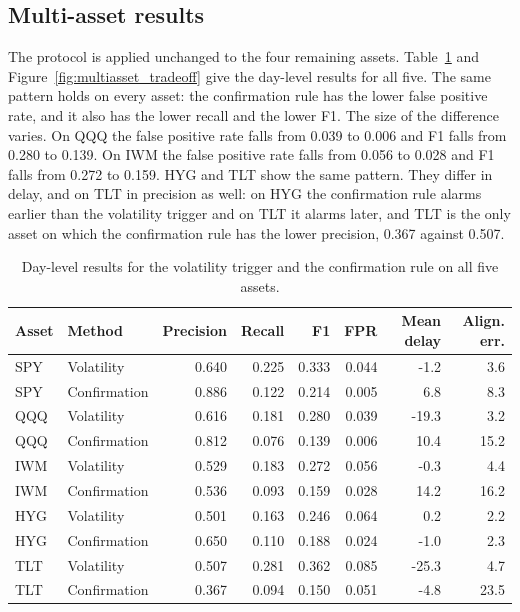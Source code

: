 \documentclass[pdflatex,sn-mathphys-num,iicol]{sn-jnl}
\begin{document}
\subsection{Multi-asset results}
The protocol is applied unchanged to the four remaining assets. Table~\ref{tab:multiasset_pointwise} and Figure~\ref{fig:multiasset_tradeoff} give the day-level results for all five. The same pattern holds on every asset: the confirmation rule has the lower false positive rate, and it also has the lower recall and the lower F1. The size of the difference varies. On QQQ the false positive rate falls from 0.039 to 0.006 and F1 falls from 0.280 to 0.139. On IWM the false positive rate falls from 0.056 to 0.028 and F1 falls from 0.272 to 0.159. HYG and TLT show the same pattern. They differ in delay, and on TLT in precision as well: on HYG the confirmation rule alarms earlier than the volatility trigger and on TLT it alarms later, and TLT is the only asset on which the confirmation rule has the lower precision, 0.367 against 0.507.

\begin{table}[t]
\centering
\caption{Day-level results for the volatility trigger and the confirmation rule on all five assets.}
\label{tab:multiasset_pointwise}
\scriptsize
\begin{tabular}{llrrrrrr}
\toprule
Asset & Method & Precision & Recall & F1 & FPR & Mean delay & Align. err.\\
\midrule
SPY & Volatility & 0.640 & 0.225 & 0.333 & 0.044 & -1.2 & 3.6\\
SPY & Confirmation & 0.886 & 0.122 & 0.214 & 0.005 & 6.8 & 8.3\\
QQQ & Volatility & 0.616 & 0.181 & 0.280 & 0.039 & -19.3 & 3.2\\
QQQ & Confirmation & 0.812 & 0.076 & 0.139 & 0.006 & 10.4 & 15.2\\
IWM & Volatility & 0.529 & 0.183 & 0.272 & 0.056 & -0.3 & 4.4\\
IWM & Confirmation & 0.536 & 0.093 & 0.159 & 0.028 & 14.2 & 16.2\\
HYG & Volatility & 0.501 & 0.163 & 0.246 & 0.064 & 0.2 & 2.2\\
HYG & Confirmation & 0.650 & 0.110 & 0.188 & 0.024 & -1.0 & 2.3\\
TLT & Volatility & 0.507 & 0.281 & 0.362 & 0.085 & -25.3 & 4.7\\
TLT & Confirmation & 0.367 & 0.094 & 0.150 & 0.051 & -4.8 & 23.5\\
\bottomrule
\end{tabular}
\end{table}
\end{document}
